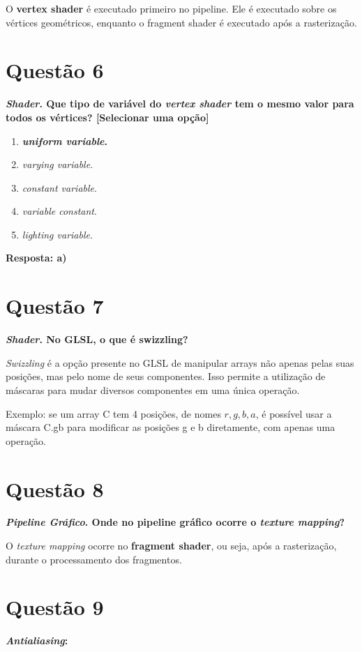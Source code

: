 \documentclass[12pt]{exam}
\begin{document}
O \textbf{vertex shader} é executado primeiro no pipeline. Ele é executado sobre os vértices geométricos, enquanto o fragment shader é executado após a rasterização.

\section*{Questão 6}
{\bfseries \textit{Shader}. Que tipo de variável do \textit{vertex shader} tem o mesmo valor para todos os vértices? [Selecionar uma opção]}

\begin{enumerate}[label=\alph*)]
    \item \textbf{\textit{uniform variable}.}
    \item \textit{varying variable}.
    \item \textit{constant variable}.
    \item \textit{variable constant}.
    \item \textit{lighting variable}.
\end{enumerate}

\textbf{Resposta: a)}

\section*{Questão 7}
{\bfseries \textit{Shader}. No GLSL, o que é swizzling?}

\textit{Swizzling} é a opção presente no GLSL de manipular arrays não apenas pelas suas posições, mas pelo nome de seus componentes. Isso permite a utilização de máscaras para mudar diversos componentes em uma única operação.

Exemplo: se um array C tem 4 posições, de nomes $r,g,b,a$, é possível usar a máscara C.gb para modificar as posições g e b diretamente, com apenas uma operação.

\section*{Questão 8}
{\bfseries \textit{Pipeline Gráfico}. Onde no pipeline gráfico ocorre o \textit{texture mapping}?}

O \textit{texture mapping} ocorre no \textbf{fragment shader}, ou seja, após a rasterização, durante o processamento dos fragmentos.

\section*{Questão 9}
{\bfseries \textit{Antialiasing}:}
\end{document}

